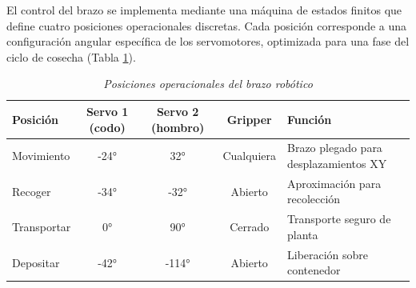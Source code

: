 El control del brazo se implementa mediante una máquina de estados finitos que define cuatro posiciones operacionales discretas. Cada posición corresponde a una configuración angular específica de los servomotores, optimizada para una fase del ciclo de cosecha (Tabla \ref{tab:estados_brazo}).

\begin{table}[H]
\centering
\small
\begin{tabular}{|l|c|c|c|p{4.5cm}|}
\hline
\textbf{Posición} & \textbf{Servo 1 (codo)} & \textbf{Servo 2 (hombro)} & \textbf{Gripper} & \textbf{Función} \\
\hline
Movimiento & -24° & 32° & Cualquiera & Brazo plegado para desplazamientos XY \\
\hline
Recoger & -34° & -32° & Abierto & Aproximación para recolección \\
\hline
Transportar & 0° & 90° & Cerrado & Transporte seguro de planta \\
\hline
Depositar & -42° & -114° & Abierto & Liberación sobre contenedor \\
\hline
\end{tabular}
\caption{\textit{Posiciones operacionales del brazo robótico}}
\label{tab:estados_brazo}
\end{table}

